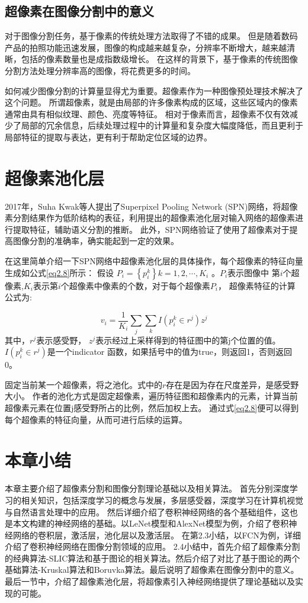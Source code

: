 \subsection{超像素在图像分割中的意义}
对于图像分割任务，基于像素的传统处理方法取得了不错的成果。
但是随着数码产品的拍照功能迅速发展，图像的构成越来越复杂，分辨率不断增大，越来越清晰，包括的像素数量也是成指数级增长。
在这样的背景下，基于像素的传统图像分割方法处理分辨率高的图像，将花费更多的时间。

如何减少图像分割的计算量显得尤为重要。超像素作为一种图像预处理技术解决了这个问题。
所谓超像素，就是由局部的许多像素构成的区域，这些区域内的像素通常由具有相似纹理、颜色、亮度等特征。
相对于像素而言，超像素不仅有效减少了局部的冗余信息，后续处理过程中的计算量和复杂度大幅度降低，而且更利于局部特征的提取与表达，更有利于帮助定位区域的边界。

\section{超像素池化层}

2017年，Suha Kwak等人提出了Superpixel Pooling Network (SPN)\cite{kwak2017weakly}网络，将超像素分割结果作为低阶结构的表征，利用提出的超像素池化层对输入网络的超像素进行提取特征，辅助语义分割的推断。
此外，SPN网络验证了使用了超像素对于提高图像分割的准确率，确实能起到一定的效果。

在这里简单介绍一下SPN网络中超像素池化层的具体操作，每个超像素的特征向量生成如公式\ref{eq2.8}所示：
假设 $P_{i}= \left \{ p_{i}^{k} \right \} k=1,2,\cdots ,K_i$ 。$P_{i}$表示图像中
第$i $个超像素,$K_i$表示第$i$个超像素中像素的个数，对于每个超像素$P_{i}$，
超像素特征的计算公式为:

\begin{equation}
v_{i} = \frac{1}{K_i}\sum_{j}\sum_{k}I(p_{i}^{k}\in r^{j})z^{j}
\label{eq2.8}
\end{equation}
其中，$r^{j}$表示感受野， $z^{j}$表示经过上采样得到的特征图中的第j个位置的值。 $I(p_{i}^{k}\in r^{j})$是一个indicator 函数，如果括号中的值为true，则返回1，否则返回0。

固定当前某一个超像素，将之池化。式中的$r$存在是因为存在尺度差异，是感受野大小。
作者的池化方式是固定超像素，遍历特征图和超像素内的元素，计算当前超像素元素在位置j感受野所占的比例，然后加权上去。
通过式\ref{eq2.8}便可以得到每个超像素的特征向量，从而可进行后续的运算。

\section{本章小结}

本章主要介绍了超像素分割和图像分割理论基础以及相关算法。
首先分别深度学习的相关知识，包括深度学习的概念与发展，多层感受器，深度学习在计算机视觉与自然语言处理中的应用。
然后详细介绍了卷积神经网络的各个基础组件，这也是本文构建的神经网络的基础。以LeNet模型和AlexNet模型为例，介绍了卷积神经网络的卷积层，激活层，池化层以及激活层。
在第2.3小结，以FCN为例，详细介绍了卷积神经网络在图像分割领域的应用。
2.4小结中，首先介绍了超像素分割的经典算法-SLIC算法和基于图论的相关算法。然后介绍了对比了基于图论的两个基础算法-Kruskal算法和Boruvka算法。最后说明了超像素在图像分割中的意义。
最后一节中，介绍了超像素池化层，将超像素引入神经网络提供了理论基础以及实现的可能。
